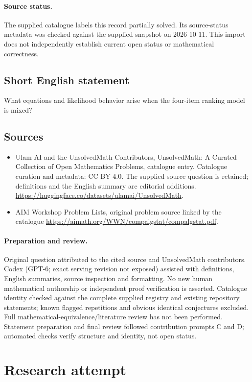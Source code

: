 \documentclass[11pt]{article}
\begin{document}
\paragraph{Source status.}
The supplied catalogue labels this record partially solved. Its source-status metadata was checked against the supplied snapshot on 2026-10-11. This import does not independently establish current open status or mathematical correctness.
\subsection{Short English statement}
What equations and likelihood behavior arise when the four-item ranking model is mixed?
\subsection{Sources}
\begin{itemize}
\item[S1] Ulam AI and the UnsolvedMath Contributors, UnsolvedMath: A Curated Collection of Open Mathematics Problems, catalogue entry. Catalogue curation and metadata: CC BY 4.0. The supplied source question is retained; definitions and the English summary are editorial additions.
\url{https://huggingface.co/datasets/ulamai/UnsolvedMath}.
\item[S2] AIM Workshop Problem Lists, original problem source linked by the catalogue
\url{https://aimath.org/WWN/compalgstat/compalgstat.pdf}.
\end{itemize}
\paragraph{Preparation and review.}
Original question attributed to the cited source and UnsolvedMath contributors. Codex (GPT-6; exact serving revision not exposed) assisted with definitions, English summaries, source inspection and formatting. No new human mathematical authorship or independent proof verification is asserted. Catalogue identity checked against the complete supplied registry and existing repository statements; known flagged repetitions and obvious identical conjectures excluded. Full mathematical-equivalence/literature review has not been performed. Statement preparation and final review followed contribution prompts C and D; automated checks verify structure and identity, not open status.
\label{end:statement}


\section{Research attempt}
\end{document}
